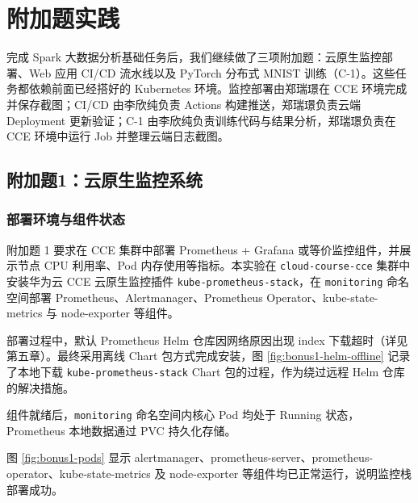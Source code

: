 \section{附加题实践}

完成 Spark 大数据分析基础任务后，我们继续做了三项附加题：云原生监控部署、Web 应用 CI/CD 流水线以及 PyTorch 分布式 MNIST 训练（C-1）。这些任务都依赖前面已经搭好的 Kubernetes 环境。监控部署由郑瑞璟在 CCE 环境完成并保存截图；CI/CD 由李欣纯负责 Actions 构建推送，郑瑞璟负责云端 Deployment 更新验证；C-1 由李欣纯负责训练代码与结果分析，郑瑞璟负责在 CCE 环境中运行 Job 并整理云端日志截图。

\subsection{附加题1：云原生监控系统}

\subsubsection{部署环境与组件状态}

附加题 1 要求在 CCE 集群中部署 Prometheus + Grafana 或等价监控组件，并展示节点 CPU 利用率、Pod 内存使用等指标。本实验在 \verb|cloud-course-cce| 集群中安装华为云 CCE 云原生监控插件 \verb|kube-prometheus-stack|，在 \verb|monitoring| 命名空间部署 Prometheus、Alertmanager、Prometheus Operator、kube-state-metrics 与 node-exporter 等组件。

部署过程中，默认 Prometheus Helm 仓库因网络原因出现 index 下载超时（详见第五章）。最终采用离线 Chart 包方式完成安装，图 \ref{fig:bonus1-helm-offline} 记录了本地下载 \verb|kube-prometheus-stack| Chart 包的过程，作为绕过远程 Helm 仓库的解决措施。


组件就绪后，\verb|monitoring| 命名空间内核心 Pod 均处于 Running 状态，Prometheus 本地数据通过 PVC 持久化存储。


图 \ref{fig:bonus1-pods} 显示 alertmanager、prometheus-server、prometheus-operator、kube-state-metrics 及 node-exporter 等组件均已正常运行，说明监控栈部署成功。


